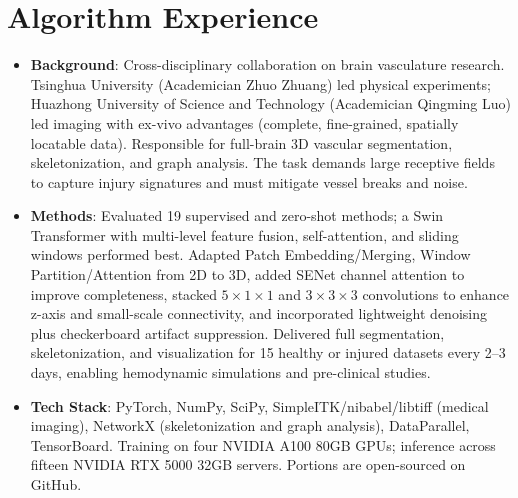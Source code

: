 \documentclass{resume}
\begin{document}

\section{Algorithm Experience}

\begin{itemize}
\item \textbf{Background}: Cross-disciplinary collaboration on brain vasculature research. Tsinghua University (Academician Zhuo Zhuang) led physical experiments; Huazhong University of Science and Technology (Academician Qingming Luo) led imaging with ex-vivo advantages (complete, fine-grained, spatially locatable data). Responsible for full-brain 3D vascular segmentation, skeletonization, and graph analysis. The task demands large receptive fields to capture injury signatures and must mitigate vessel breaks and noise.

\item \textbf{Methods}: Evaluated 19 supervised and zero-shot methods; a Swin Transformer with multi-level feature fusion, self-attention, and sliding windows performed best. Adapted Patch Embedding/Merging, Window Partition/Attention from 2D to 3D, added SENet channel attention to improve completeness, stacked $5 \times 1 \times 1$ and $3 \times 3 \times 3$ convolutions to enhance z-axis and small-scale connectivity, and incorporated lightweight denoising plus checkerboard artifact suppression. Delivered full segmentation, skeletonization, and visualization for 15 healthy or injured datasets every 2–3 days, enabling hemodynamic simulations and pre-clinical studies.

\item \textbf{Tech Stack}: PyTorch, NumPy, SciPy, SimpleITK/nibabel/libtiff (medical imaging), NetworkX (skeletonization and graph analysis), DataParallel, TensorBoard. Training on four NVIDIA A100 80GB GPUs; inference across fifteen NVIDIA RTX 5000 32GB servers. Portions are open-sourced on GitHub.

\end{itemize}

\end{document}
